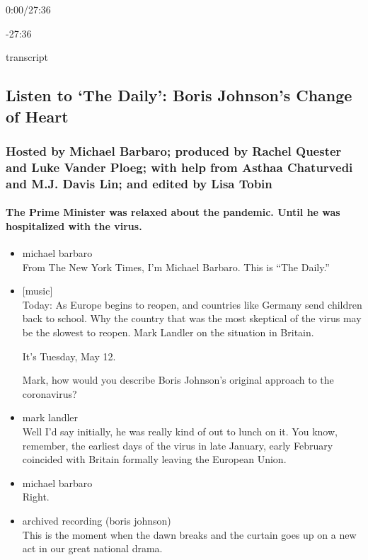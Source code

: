 0:00/27:36

-27:36

transcript

\hypertarget{listen-to-the-daily-boris-johnsons-change-of-heart-1}{%
\subsection{Listen to `The Daily': Boris Johnson's Change of
Heart}\label{listen-to-the-daily-boris-johnsons-change-of-heart-1}}

\hypertarget{hosted-by-michael-barbaro-produced-by-rachel-quester-and-luke-vander-ploeg-with-help-from-asthaa-chaturvedi-and-mj-davis-lin-and-edited-by-lisa-tobin}{%
\subsubsection{Hosted by Michael Barbaro; produced by Rachel Quester and
Luke Vander Ploeg; with help from Asthaa Chaturvedi and M.J. Davis Lin;
and edited by Lisa
Tobin}\label{hosted-by-michael-barbaro-produced-by-rachel-quester-and-luke-vander-ploeg-with-help-from-asthaa-chaturvedi-and-mj-davis-lin-and-edited-by-lisa-tobin}}

\hypertarget{the-prime-minister-was-relaxed-about-the-pandemic-until-he-was-hospitalized-with-the-virus}{%
\paragraph{The Prime Minister was relaxed about the pandemic. Until he
was hospitalized with the
virus.}\label{the-prime-minister-was-relaxed-about-the-pandemic-until-he-was-hospitalized-with-the-virus}}

\begin{itemize}
\item
  michael barbaro\\
  From The New York Times, I'm Michael Barbaro. This is ``The Daily.''
\item
  {[}music{]}\\
  Today: As Europe begins to reopen, and countries like Germany send
  children back to school. Why the country that was the most skeptical
  of the virus may be the slowest to reopen. Mark Landler on the
  situation in Britain.

  It's Tuesday, May 12.

  Mark, how would you describe Boris Johnson's original approach to the
  coronavirus?
\item
  mark landler\\
  Well I'd say initially, he was really kind of out to lunch on it. You
  know, remember, the earliest days of the virus in late January, early
  February coincided with Britain formally leaving the European Union.
\item
  michael barbaro\\
  Right.
\item
  archived recording (boris johnson)\\
  This is the moment when the dawn breaks and the curtain goes up on a
  new act in our great national drama.
\end{itemize}

